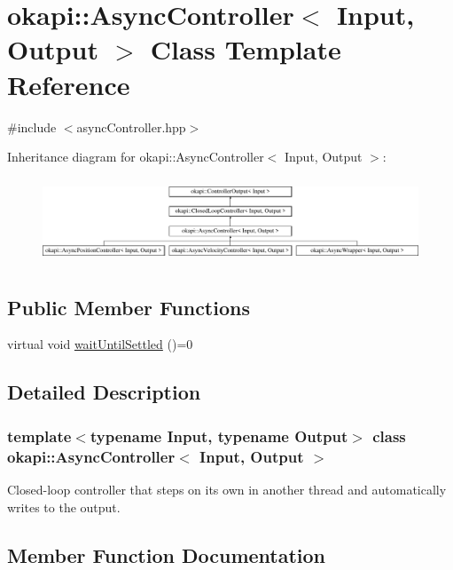 \hypertarget{classokapi_1_1AsyncController}{}\section{okapi\+::Async\+Controller$<$ Input, Output $>$ Class Template Reference}
\label{classokapi_1_1AsyncController}


{\ttfamily \#include $<$async\+Controller.\+hpp$>$}

Inheritance diagram for okapi\+::Async\+Controller$<$ Input, Output $>$\+:\begin{figure}[H]
\begin{center}
\leavevmode
\includegraphics[height=2.565865cm]{classokapi_1_1AsyncController}
\end{center}
\end{figure}
\subsection*{Public Member Functions}
\begin{DoxyCompactItemize}
\item 
virtual void \mbox{\hyperlink{classokapi_1_1AsyncController_a20e19f334e3dc7a3092e0e4355edcf49}{wait\+Until\+Settled}} ()=0
\end{DoxyCompactItemize}


\subsection{Detailed Description}
\subsubsection*{template$<$typename Input, typename Output$>$\newline
class okapi\+::\+Async\+Controller$<$ Input, Output $>$}

Closed-\/loop controller that steps on its own in another thread and automatically writes to the output. 

\subsection{Member Function Documentation}
\mbox{\label{classokapi_1_1AsyncController_a20e19f334e3dc7a3092e0e4355edcf49}} 
